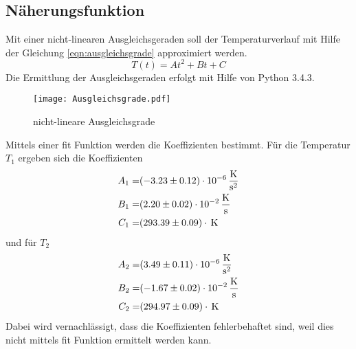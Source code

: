 \subsection{Näherungsfunktion}
Mit einer nicht-linearen Ausgleichsgeraden soll der Temperaturverlauf mit Hilfe der Gleichung \ref{eqn:ausgleichsgrade} approximiert werden.
\begin{equation}
  T(t) = At^2 + Bt +C
  \label{eqn:ausgleichsgrade}
\end{equation}
Die Ermittlung der Ausgleichsgeraden erfolgt mit Hilfe von Python 3.4.3.
\begin{figure}
  \centering
  \texttt{[image: Ausgleichsgrade.pdf]}
  \caption{nicht-lineare Ausgleichsgrade}
  \label{fig:ausg}
\end{figure}
Mittels einer fit Funktion werden die Koeffizienten bestimmt. Für die Temperatur $T_\text{1}$ ergeben sich die Koeffizienten
\begin{eqnarray*}
  A_1 =& (\num{-3.23 +- 0.12}) \cdot 10^{-6} \, \frac{\text{K}}{\text{s}^2}	\\
  B_1 =& (\num{2.20 +- 0.02}) \cdot 10^{-2} \, \frac{\text{K}}{\text{s}} 	\\
C_1 =& (\num{293.39 +- 0.09})  \cdot \, \text{K}
  \label{eqn:koefT1}
\end{eqnarray*}
und für $T_\text{2}$
\begin{eqnarray*}
  A_2 =& (\num{3.49 +- 0.11}) \cdot 10^{-6} \, \frac{\text{K}}{\text{s}^2} 	\\
  B_2 =& (\num{-1.67 +- 0.02}) \cdot 10^{-2} \, \frac{\text{K}}{\text{s}} 	\\
  C_2 =& (\num{294.97 +- 0.09}) \cdot \, \text{K}
  \label{eqn:koefT2}
\end{eqnarray*}
Dabei wird vernachlässigt, dass die Koeffizienten fehlerbehaftet sind, weil dies nicht mittels fit Funktion ermittelt werden kann.
